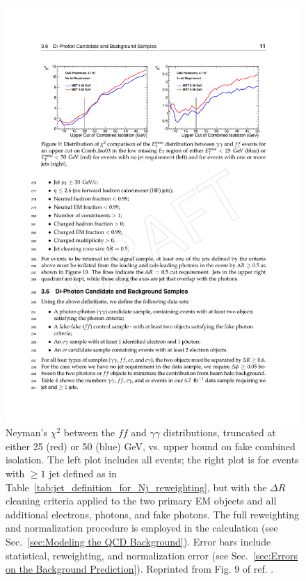 \documentclass[dissertation.tex]{subfiles}
\begin{document}
\begin{figure}
	\centering
	\includegraphics[scale=0.9]{f_comb_iso_upper_bound_optimization}
	\caption{Neyman's $\chi^{2}$ between the $\mathit{ff}$ and $\gamma\gamma$ \MET distributions, truncated at either 25 (red) or 50 (blue) GeV, vs. upper bound on fake combined isolation.  The left plot includes all events; the right plot is for events with $\geq 1$ jet defined as in Table~\ref{tab:jet_definition_for_Nj_reweighting}, but with the $\Delta R$ cleaning criteria applied to the two primary EM objects and all additional electrons, photons, and fake photons.  The full reweighting and normalization procedure is employed in the \MET calculation (see Sec.~\ref{sec:Modeling the QCD Background}).  Error bars include statistical, reweighting, and normalization error (see Sec.~\ref{sec:Errors on the Background Prediction}).  Reprinted from Fig. 9 of ref. \cite{CMS_AN-2011-515}.}
	\label{fig:f_comb_iso_upper_bound_optimization}
\end{figure}
\end{document}
